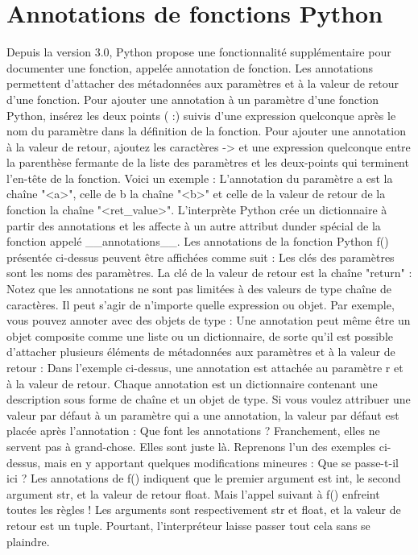 \section{Annotations de fonctions Python}
Depuis la version 3.0, Python propose une fonctionnalité supplémentaire pour documenter une fonction, appelée annotation de fonction.  Les annotations permettent d'attacher des métadonnées aux paramètres et à la valeur de retour d'une fonction.
Pour ajouter une annotation à un paramètre d'une fonction Python, insérez les deux points ( :) suivis d'une expression quelconque après le nom du paramètre dans la définition de la fonction.  Pour ajouter une annotation à la valeur de retour, ajoutez les caractères -> et une expression quelconque entre la parenthèse fermante de la liste des paramètres et les deux-points qui terminent l'en-tête de la fonction. Voici un exemple :
L'annotation du paramètre a est la chaîne "<a>", celle de b la chaîne "<b>" et celle de la valeur de retour de la fonction la chaîne "<ret_value>".
L'interprète Python crée un dictionnaire à partir des annotations et les affecte à un autre attribut dunder spécial de la fonction appelé __annotations__.  Les annotations de la fonction Python f() présentée ci-dessus peuvent être affichées comme suit :
Les clés des paramètres sont les noms des paramètres. La clé de la valeur de retour est la chaîne "return" :
Notez que les annotations ne sont pas limitées à des valeurs de type chaîne de caractères. Il peut s'agir de n'importe quelle expression ou objet. Par exemple, vous pouvez annoter avec des objets de type :
Une annotation peut même être un objet composite comme une liste ou un dictionnaire, de sorte qu'il est possible d'attacher plusieurs éléments de métadonnées aux paramètres et à la valeur de retour :
Dans l'exemple ci-dessus, une annotation est attachée au paramètre r et à la valeur de retour.  Chaque annotation est un dictionnaire contenant une description sous forme de chaîne et un objet de type.
Si vous voulez attribuer une valeur par défaut à un paramètre qui a une annotation, la valeur par défaut est placée après l'annotation :
Que font les annotations ?  Franchement, elles ne servent pas à grand-chose.  Elles sont juste là.  Reprenons l'un des exemples ci-dessus, mais en y apportant quelques modifications mineures :
Que se passe-t-il ici ?  Les annotations de f() indiquent que le premier argument est int, le second argument str, et la valeur de retour float.  Mais l'appel suivant à f() enfreint toutes les règles !  Les arguments sont respectivement str et float, et la valeur de retour est un tuple.  Pourtant, l'interpréteur laisse passer tout cela sans se plaindre.
